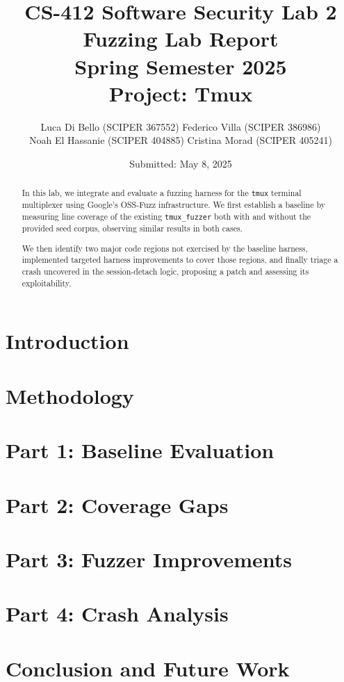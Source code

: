 \documentclass[11pt,a4paper,twocolumn]{article}
\title{%
  CS-412 Software Security Lab 2\\[0.5em]
  \Large Fuzzing Lab Report\\
  Spring Semester 2025\\[0.5em]
  Project: Tmux
}
\author{%
  Luca Di Bello (SCIPER 367552)
  Federico Villa (SCIPER 386986) \\
  Noah El Hassanie (SCIPER 404885)
  Cristina Morad (SCIPER 405241) \\
}
\date{Submitted: May 8, 2025}
\begin{document}
\maketitle

\begin{abstract}
	In this lab, we integrate and evaluate a fuzzing harness for the \texttt{tmux} terminal
	multiplexer using Google’s OSS-Fuzz infrastructure. We first establish a baseline
	by measuring line coverage of the existing \texttt{tmux\_fuzzer} both with and without the
	provided seed corpus, observing similar results in both cases.

	We then identify two major code regions not exercised by the baseline harness, implemented
	targeted harness improvements to cover those regions, and finally triage a crash uncovered
	in the session-detach logic, proposing a patch and assessing its exploitability.
\end{abstract}

\section{Introduction}
\label{sec:introduction}



\section{Methodology}
\label{sec:methodology}



\section{Part 1: Baseline Evaluation}



\section{Part 2: Coverage Gaps}



\section{Part 3: Fuzzer Improvements}



\section{Part 4: Crash Analysis}



\section{Conclusion and Future Work}



\printbibliography
\end{document}
